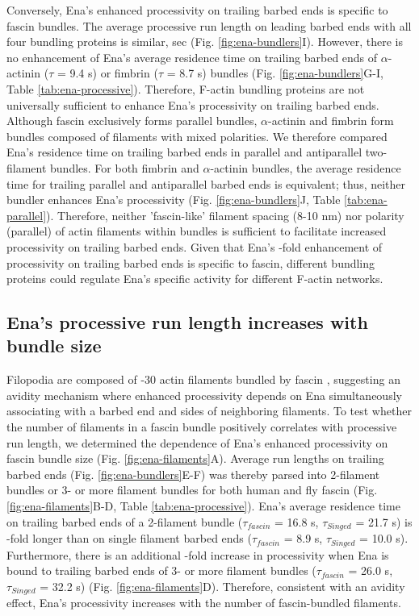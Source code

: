 Conversely, Ena's enhanced processivity on trailing barbed ends is specific to fascin bundles. The average processive run length on leading barbed ends with all four bundling proteins is similar,  sec (Fig. \ref{fig:ena-bundlers}I). However, there is no enhancement of Ena's average residence time on trailing barbed ends of $\alpha$-actinin ($\tau$ = 9.4 s) or fimbrin ($\tau$ = 8.7 s) bundles (Fig. \ref{fig:ena-bundlers}G-I, Table \ref{tab:ena-processive}). Therefore, F-actin bundling proteins are not universally sufficient to enhance Ena's processivity on trailing barbed ends. Although fascin exclusively forms parallel bundles, $\alpha$-actinin and fimbrin form bundles composed of filaments with mixed polarities. We therefore compared Ena's residence time on trailing barbed ends in parallel and antiparallel two-filament bundles. For both fimbrin and $\alpha$-actinin bundles, the average residence time for trailing parallel and antiparallel barbed ends is equivalent; thus, neither bundler enhances Ena's processivity (Fig. \ref{fig:ena-bundlers}J, Table \ref{tab:ena-parallel}). Therefore, neither 'fascin-like' filament spacing (8-10 nm) nor polarity (parallel) of actin filaments within bundles is sufficient to facilitate increased processivity on trailing barbed ends. Given that Ena's -fold enhancement of processivity on trailing barbed ends is specific to fascin, different bundling proteins could regulate Ena's specific activity for different F-actin networks. 

\subsection{Ena's processive run length increases with bundle size}\label{ena-bundle-size}

Filopodia are composed of -30 actin filaments bundled by fascin \citep{svitkina_mechanism_2003,faix_making_2006}, suggesting an avidity mechanism where enhanced processivity depends on Ena simultaneously associating with a barbed end and sides of neighboring filaments. To test whether the number of filaments in a fascin bundle positively correlates with processive run length, we determined the dependence of Ena's enhanced processivity on fascin bundle size (Fig. \ref{fig:ena-filaments}A). Average run lengths on trailing barbed ends (Fig. \ref{fig:ena-bundlers}E-F) was thereby parsed into 2-filament bundles or 3- or more filament bundles for both human and fly fascin (Fig. \ref{fig:ena-filaments}B-D, Table \ref{tab:ena-processive}). Ena's average residence time on trailing barbed ends of a 2-filament bundle ($\tau_{fascin}$ = 16.8 s, $\tau_{Singed}$ = 21.7 s) is -fold longer than on single filament barbed ends ($\tau_{fascin}$ = 8.9 s, $\tau_{Singed}$ = 10.0 s). Furthermore, there is an additional -fold increase in processivity when Ena is bound to trailing barbed ends of 3- or more filament bundles ($\tau_{fascin}$ = 26.0 s, $\tau_{Singed}$ = 32.2 s) (Fig. \ref{fig:ena-filaments}D). Therefore, consistent with an avidity effect, Ena's processivity increases with the number of fascin-bundled filaments. 

